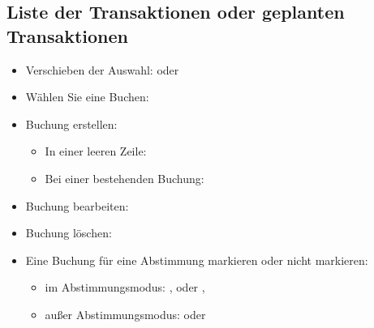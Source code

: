\subsection{Liste der Transaktionen oder geplanten Transaktionen}

\begin{itemize}
	\item Verschieben der Auswahl: \keys{\arrowkeyup} oder \keys{\arrowkeydown}
	\item Wählen Sie eine Buchen: 
	\item Buchung erstellen:%
	\begin{itemize}
		\item In einer leeren Zeile: 
		\item Bei einer bestehenden Buchung: 
	\end{itemize}
	\item Buchung bearbeiten: 
	\item Buchung löschen: 
	\item Eine Buchung für eine Abstimmung markieren oder nicht markieren:
		\begin{itemize}
			\item im Abstimmungsmodus: ,  oder ,
			\item außer Abstimmungsmodus:  oder 
		\end{itemize}

\end{itemize}
